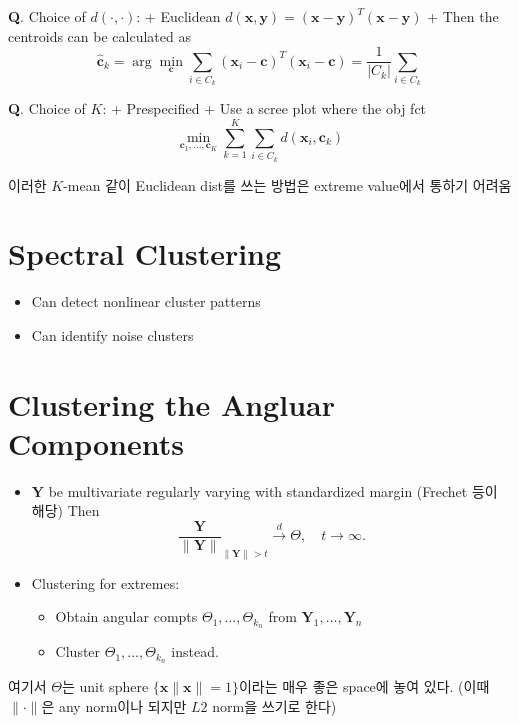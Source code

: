 \documentclass[
  13pt,
  letterpaper,
  DIV=11,
  numbers=noendperiod]{scrreprt}
\providecommand{\tightlist}{%
  \setlength{\itemsep}{0pt}\setlength{\parskip}{0pt}}\usepackage{longtable,booktabs,array}
\theoremstyle{plain}
\theoremstyle{definition}
\theoremstyle{definition}
\theoremstyle{plain}
\theoremstyle{definition}
\theoremstyle{plain}
\theoremstyle{remark}
\begin{document}
\textbf{Q}. Choice of \(d(\cdot, \cdot)\): + Euclidean
\(d(\pmb{x}, \pmb{y}) = (\pmb{x}- \pmb{y})^T(\pmb{x}- \pmb{y})\) + Then
the centroids can be calculated as \[
  \hat{\pmb{c}}_k = \arg\min_{\pmb{c}} \sum_{i\in C_k}(\pmb{x}_i - \pmb{c})^T(\pmb{x}_i - \pmb{c}) = \frac{1}{|C_k|} \sum_{i\in C_k}
  \]

\textbf{Q}. Choice of \(K\): + Prespecified + Use a scree plot where the
obj fct \[
  \min_{\pmb{c}_1, \ldots, \pmb{c}_K} \sum_{k=1}^K \sum_{i \in C_k} d(\pmb{x}_i , \pmb{c}_k)
  \]

이러한 \(K\)-mean 같이 Euclidean dist를 쓰는 방법은 extreme value에서
통하기 어려움

\section{Spectral Clustering}\label{spectral-clustering}

\begin{itemize}
\item
  Can detect nonlinear cluster patterns
\item
  Can identify noise clusters
\end{itemize}

\section{Clustering the Angluar
Components}\label{clustering-the-angluar-components}

\begin{itemize}
\item
  \(\pmb{Y}\) be multivariate regularly varying with standardized margin
  (Frechet 등이 해당) Then \[
  \frac{\pmb{Y}}{\|\pmb{Y}\|}_{\| \pmb{Y}\|>t}\stackrel{d}{\rightarrow} \Theta, \quad{} t \rightarrow \infty.
  \]
\item
  Clustering for extremes:

  \begin{itemize}
  \tightlist
  \item
    Obtain angular compts \(\Theta_1, \ldots, \Theta_{k_n}\) from
    \(\pmb{Y}_1, \ldots , \pmb{Y}_n\)
  \item
    Cluster \(\Theta_1, \ldots, \Theta_{k_n}\) instead.
  \end{itemize}
\end{itemize}

여기서 \(\Theta\)는 unit sphere \(\{ \pmb{x} \| \pmb{x} \| = 1\}\)이라는
매우 좋은 space에 놓여 있다. (이때 \(\| \cdot \|\)은 any norm이나 되지만
\(L2\) norm을 쓰기로 한다)
\end{document}
